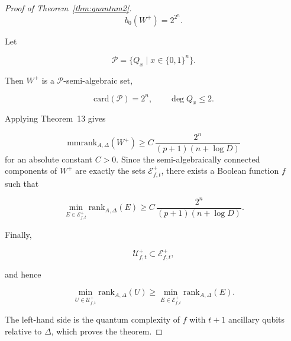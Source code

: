 \documentclass[10pt,a4paper]{amsart}
\newcommand{\card}{\mathrm{card}}
\newcommand{\mmrank}{\mathrm{mmrank}}
\newcommand{\rank}{\mathrm{rank}}
\begin{document}
\begin{proof}[Proof of Theorem~\ref{thm:quantum2}]
$$
b_0(W^{+})=2^{2^{n}}.
$$

Let

$$
\mathcal P=\{Q_x\mid x\in\{0,1\}^{n}\}.
$$

Then \(W^{+}\) is a \(\mathcal P\)-semi-algebraic set,

$$
\card(\mathcal P)=2^{n},
\qquad
\deg Q_x\leq2.
$$

Applying Theorem~13 gives

$$
\mmrank_{A,\Delta}(W^{+})
\geq
C\,
\frac{2^{n}}
     {(p+1)(n+\log D)}
$$
for an absolute constant \(C>0\).
Since the semi-algebraically connected components of \(W^{+}\) are exactly
the sets \(\mathcal E^{+}_{f,t}\), there exists a Boolean function \(f\)
such that

$$
\min_{E\in\mathcal E^{+}_{f,t}}
\rank_{A,\Delta}(E)
\geq
C\,
\frac{2^{n}}
     {(p+1)(n+\log D)}.
$$

Finally,

$$
\mathcal U^{+}_{f,t}\subset\mathcal E^{+}_{f,t},
$$

and hence

$$
\min_{U\in\mathcal U^{+}_{f,t}}
\rank_{A,\Delta}(U)
\geq
\min_{E\in\mathcal E^{+}_{f,t}}
\rank_{A,\Delta}(E).
$$

The left-hand side is the quantum complexity of \(f\) with \(t+1\)
ancillary qubits relative to \(\Delta\), which proves the theorem.
\end{proof}
\end{document}
